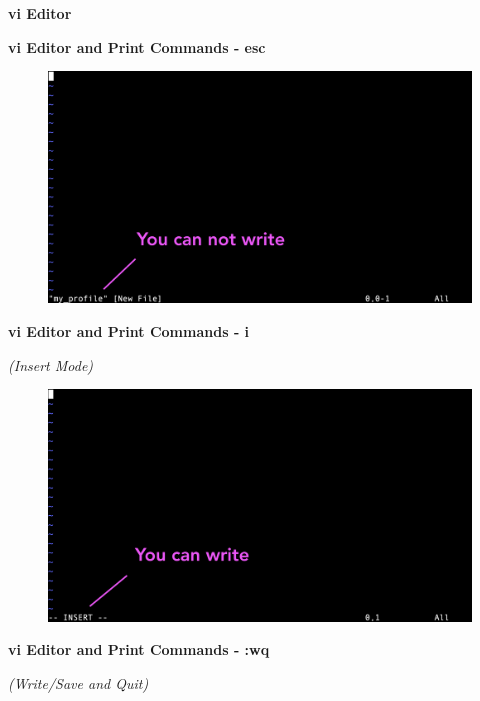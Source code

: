 \documentclass[ignorenonframetext,]{beamer}
\begin{document}
\begin{frame}[fragile]{\textbf{vi Editor}}
\begin{block}{\textbf{vi Editor and Print Commands - {\textbf{esc}}}}
\begin{figure}
\centering
\includegraphics{vi_1.png}
\caption{}
\end{figure}

\end{block}

\begin{block}{\textbf{vi Editor and Print Commands - {\textbf{i}}}}

\emph{(Insert Mode)}

\begin{figure}
\centering
\includegraphics{vi_2.png}
\caption{}
\end{figure}

\end{block}

\begin{block}{\textbf{vi Editor and Print Commands - {\textbf{:wq}}}}

\emph{(Write/Save and Quit)}


\end{block}
\end{frame}
\end{document}
